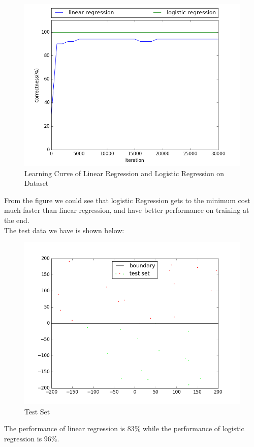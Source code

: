 \documentclass[11pt,twoside]{article}
\begin{document}
\begin{figure}[h]
	\centering
	\includegraphics[scale=0.8]{part5_learning_curve.png}
	\caption*{Learning Curve of Linear Regression and Logistic Regression on Dataset}
\end{figure}
From the figure we could see that logistic Regression gets to the minimum cost much faster than linear regression, and have better performance on training at the end.\\
The test data we have is shown below: 
\begin{figure}[h]
	\centering
	\includegraphics[scale=0.8]{part5_test_data.png}
	\caption*{Test Set}
\end{figure}
The performance of linear regression is 83\% while the performance of logistic regression is 96\%.
\clearpage
\end{document}
